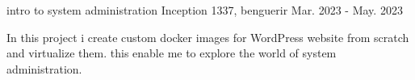 \begin{cventries}
  \cventry
    {intro to system administration} %
    {Inception} %
   {1337, benguerir} %
    {Mar. 2023 - May. 2023} %
    {
      \begin{cvitems} %
        \item {In this project i create custom docker images for WordPress website
from scratch and virtualize them. this enable me to explore the world
of system administration.}
      \end{cvitems}
    }



\end{cventries}
